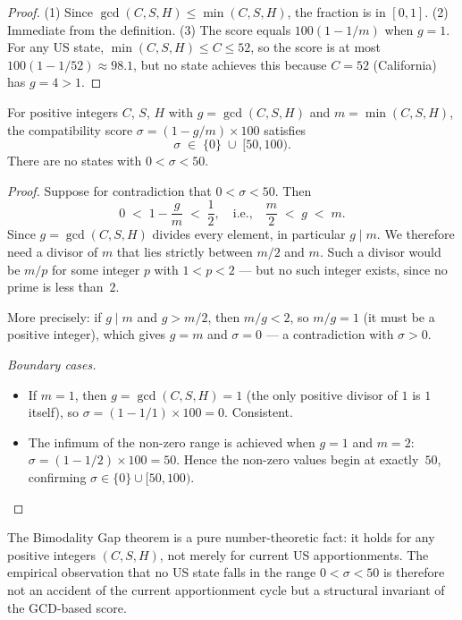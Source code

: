 \begin{proof}
(1) Since $\gcd(C,S,H) \leq \min(C,S,H)$, the fraction is in $[0,1]$.
(2) Immediate from the definition.
(3) The score equals $100(1 - 1/m)$ when $g=1$.  For any US state,
$\min(C,S,H) \leq C \leq 52$, so the score is at most $100(1 - 1/52) \approx 98.1$,
but no state achieves this because $C=52$ (California) has $g=4 > 1$.
\end{proof}

\begin{theorem}
\label{thm:bimodal}
For positive integers $C$, $S$, $H$ with $g = \gcd(C,S,H)$ and
$m = \min(C,S,H)$, the compatibility score $\sigma = (1 - g/m)\times 100$
satisfies
\[
  \sigma \;\in\; \{0\} \;\cup\; [50, 100).
\]
There are no states with $0 < \sigma < 50$.
\end{theorem}

\begin{proof}
Suppose for contradiction that $0 < \sigma < 50$.  Then
\[
  0 \;<\; 1 - \frac{g}{m} \;<\; \frac{1}{2},
  \quad\text{i.e.,}\quad
  \frac{m}{2} \;<\; g \;<\; m.
\]
Since $g = \gcd(C,S,H)$ divides every element, in particular $g \mid m$.
We therefore need a divisor of $m$ that lies strictly between $m/2$ and $m$.
Such a divisor would be $m/p$ for some integer $p$ with $1 < p < 2$ ---
but no such integer exists, since no prime is less than~$2$.

More precisely: if $g \mid m$ and $g > m/2$, then $m/g < 2$, so $m/g = 1$
(it must be a positive integer), which gives $g = m$ and $\sigma = 0$ ---
a contradiction with $\sigma > 0$.

\medskip
\noindent\textit{Boundary cases.}
\begin{itemize}
  \item If $m = 1$, then $g = \gcd(C,S,H) = 1$ (the only positive divisor of
        $1$ is $1$ itself), so $\sigma = (1 - 1/1)\times 100 = 0$.  Consistent.
  \item The infimum of the non-zero range is achieved when $g = 1$ and $m = 2$:
        $\sigma = (1 - 1/2)\times 100 = 50$.  Hence the non-zero values begin
        at exactly~$50$, confirming $\sigma \in \{0\} \cup [50, 100)$.
\end{itemize}
\end{proof}

\begin{remark}
The Bimodality Gap theorem is a pure number-theoretic fact: it holds for any
positive integers $(C, S, H)$, not merely for current US apportionments.
The empirical observation that no US state falls in the range $0 < \sigma < 50$
is therefore not an accident of the current apportionment cycle but a structural
invariant of the GCD-based score.
\end{remark}

